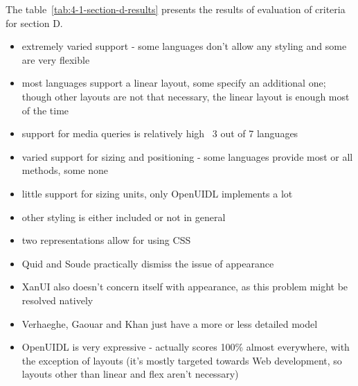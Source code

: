 The table~\ref{tab:4-1-section-d-results} presents the results of evaluation of criteria for section D\@.
\begin{itemize}
    \item extremely varied support - some languages don't allow any styling and some are very flexible
    \item most languages support a linear layout, some specify an additional one; though other layouts are not that necessary, the linear layout is enough most of the time
    \item support for media queries is relatively high \textendash\ 3 out of 7 languages
    \item varied support for sizing and positioning - some languages provide most or all methods, some none
    \item little support for sizing units, only OpenUIDL implements a lot
    \item other styling is either included or not in general
    \item two representations allow for using CSS
\end{itemize}
\begin{itemize}
    \item Quid and Soude practically dismiss the issue of appearance
    \item XanUI also doesn't concern itself with appearance, as this problem might be resolved natively
    \item Verhaeghe, Gaouar and Khan just have a more or less detailed model
    \item OpenUIDL is very expressive - actually scores 100\% almost everywhere, with the exception of layouts (it's mostly targeted towards Web development, so layouts other than linear and flex aren't necessary)
\end{itemize}

